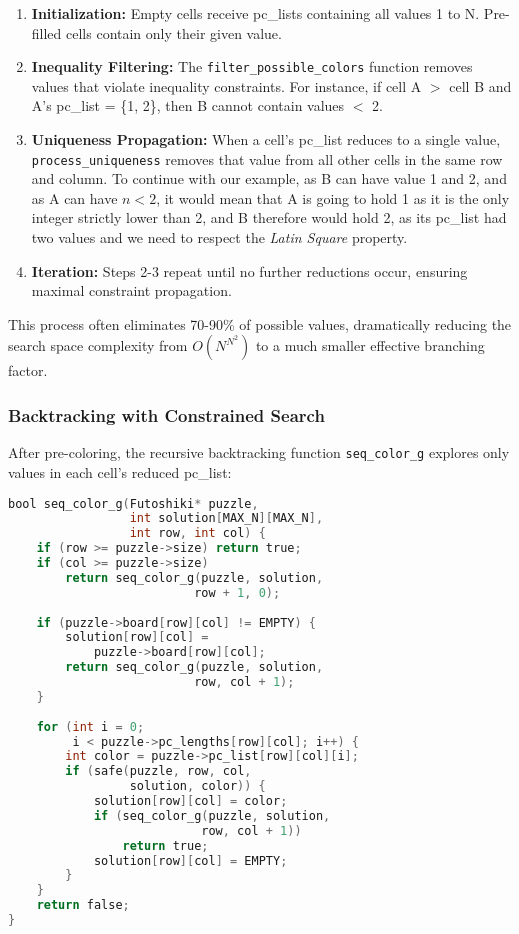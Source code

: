 \begin{enumerate}
    \item \textbf{Initialization:} Empty cells receive pc\_lists containing all values 1 to N. Pre-filled cells contain only their given value.
    
    \item \textbf{Inequality Filtering:} The \texttt{filter\_possible\_colors} function removes values that violate inequality constraints. For instance, if cell A $>$ cell B and A's pc\_list = \{1, 2\}, then B cannot contain values $<$ 2.
    
    \item \textbf{Uniqueness Propagation:} When a cell's pc\_list reduces to a single value, \texttt{process\_uniqueness} removes that value from all other cells in the same row and column. To continue with our example, as B can have value 1 and 2, and as A can have $n < 2$, it would mean that A is going to hold 1 as it is the only integer strictly lower than 2, and B therefore would hold 2, as its pc\_list had two values and we need to respect the \textit{Latin Square} property.
    
    \item \textbf{Iteration:} Steps 2-3 repeat until no further reductions occur, ensuring maximal constraint propagation.
\end{enumerate}

This process often eliminates 70-90\% of possible values, dramatically reducing the search space complexity from $O(N^{N^2})$ to a much smaller effective branching factor.

\subsubsection{Backtracking with Constrained Search}
\label{subsubsec:backtrack_with_csp}
After pre-coloring, the recursive backtracking function \texttt{seq\_color\_g} explores only values in each cell's reduced pc\_list:

\begin{lstlisting}[language=C, caption=Sequential backtracking core, label={listing:precoloring}]
bool seq_color_g(Futoshiki* puzzle, 
                 int solution[MAX_N][MAX_N], 
                 int row, int col) {
    if (row >= puzzle->size) return true;
    if (col >= puzzle->size) 
        return seq_color_g(puzzle, solution, 
                          row + 1, 0);
    
    if (puzzle->board[row][col] != EMPTY) {
        solution[row][col] = 
            puzzle->board[row][col];
        return seq_color_g(puzzle, solution, 
                          row, col + 1);
    }
    
    for (int i = 0; 
         i < puzzle->pc_lengths[row][col]; i++) {
        int color = puzzle->pc_list[row][col][i];
        if (safe(puzzle, row, col, 
                 solution, color)) {
            solution[row][col] = color;
            if (seq_color_g(puzzle, solution, 
                           row, col + 1))
                return true;
            solution[row][col] = EMPTY;
        }
    }
    return false;
}
\end{lstlisting}

